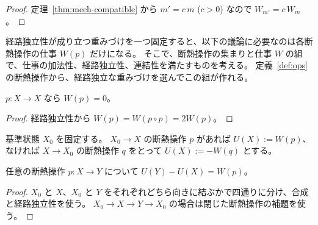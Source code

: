 \begin{proof}
  \leanok
  定理~\ref{thm:mech-compatible} から $m' = c\, m$ ($c > 0$) なので $W_{m'} = c\, W_m$。
\end{proof}

\begin{definition}[経路独立な仕事を持つ断熱操作]
  \label{def:processes}
  \leanok
  経路独立性が成り立つ重みづけを一つ固定すると、以下の議論に必要なのは各断熱操作の仕事 $W(p)$ だけになる。
  そこで、断熱操作の集まりと仕事 $W$ の組で、仕事の加法性、経路独立性、連結性を満たすものを考える。
  定義~\ref{def:ops} の断熱操作から、経路独立な重みづけを選んでこの組が作れる。
\end{definition}

\begin{lemma}[閉じた断熱操作の仕事]
  \label{lem:work-loop}
  \leanok
  $p : X \to X$ なら $W(p) = 0$。
\end{lemma}

\begin{proof}
  \leanok
  経路独立性から $W(p) = W(p \circ p) = 2 W(p)$。
\end{proof}

\begin{definition}[内部エネルギー]
  \label{def:internal-energy}
  \leanok
  基準状態 $X_0$ を固定する。
  $X_0 \to X$ の断熱操作 $p$ があれば $U(X) := W(p)$、なければ $X \to X_0$ の断熱操作 $q$ をとって $U(X) := -W(q)$ とする。
\end{definition}

\begin{theorem}[内部エネルギーの存在]
  \label{thm:internal-energy}
  \leanok
  任意の断熱操作 $p : X \to Y$ について $U(Y) - U(X) = W(p)$。
\end{theorem}

\begin{proof}
  \leanok
  $X_0$ と $X$、$X_0$ と $Y$ をそれぞれどちら向きに結ぶかで四通りに分け、合成と経路独立性を使う。
  $X_0 \to X \to Y \to X_0$ の場合は閉じた断熱操作の補題を使う。
\end{proof}


